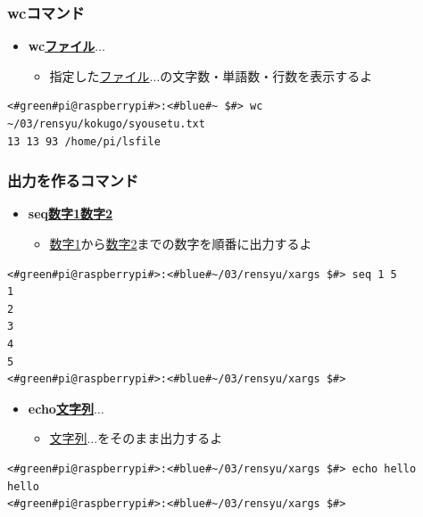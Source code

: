 \documentclass[slide03.tex]{subfiles}
\begin{document}
\begin{frame}[fragile]
    \frametitle{wcコマンド}
    \begin{itemize}
        \item {\bf wc\textvisiblespace\underline{ファイル}$\ldots$}
        \begin{itemize}
            \small
            \item[] 指定した\underline{ファイル}$\ldots$の文字数・単語数・行数を表示するよ
        \end{itemize}
    \end{itemize}
    \begin{lstlisting}[title=wcコマンドの実行例, label=wc_example]
<#green#pi@raspberrypi#>:<#blue#~ $#> wc  ~/03/rensyu/kokugo/syousetu.txt
13 13 93 /home/pi/lsfile
    \end{lstlisting}
\end{frame}

\begin{frame}[fragile]
    \frametitle{出力を作るコマンド}
    \begin{itemize}
        \item {\bf seq\textvisiblespace\underline{数字1}\textvisiblespace\underline{数字2}}
        \begin{itemize}
            \small
            \item[] \underline{数字1}から\underline{数字2}までの数字を順番に出力するよ
        \end{itemize}
    \end{itemize}
    \begin{lstlisting}
<#green#pi@raspberrypi#>:<#blue#~/03/rensyu/xargs $#> seq 1 5
1
2
3
4
5
<#green#pi@raspberrypi#>:<#blue#~/03/rensyu/xargs $#>
    \end{lstlisting}
    \begin{itemize}
        \item {\bf echo\textvisiblespace\underline{文字列}$\ldots$}
        \begin{itemize}
            \small
            \item[] \underline{文字列}$\ldots$をそのまま出力するよ
        \end{itemize}
    \end{itemize}
    \begin{lstlisting}
<#green#pi@raspberrypi#>:<#blue#~/03/rensyu/xargs $#> echo hello
hello
<#green#pi@raspberrypi#>:<#blue#~/03/rensyu/xargs $#>
    \end{lstlisting}
\end{frame}
\end{document}
